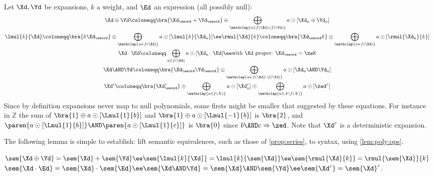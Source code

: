 \documentclass[a4paper,USenglish]{lipics}
\begin{document}
Let $\Xd, \Yd$ be expansions, $k$ a weight, and $\Ed$ an expression (all
possibly null):
\begin{gather}
  \label{eq:epn:plus:epn}
  \Xd \oplus \Yd
  \coloneqq
  \bra{\Xd_\eword+ \Yd_\eword}\oplus\bigoplus_{\mathclap{a \in f(\Xd) \cup f(\Yd)}} a \odot [\Xd_a \oplus \Yd_a]
  \\
  \lmul{k}{\Xd} \coloneqq \bra{k\Xd_\eword} \oplus \bigoplus_{\mathclap{a \in f(\Xd)}} a \odot [\lmul{k}{\Xd_a}]
  \ee
\rmul{\Xd}{k} \coloneqq \bra{\Xd_\eword k} \oplus \bigoplus_{\mathclap{a \in f(\Xd)}} a \odot [\rmul{\Xd_a}{k}]
  \\
  \label{eq:epn:mul:epn}
  \Xd\cdot\Ed \coloneqq \bigoplus_{a \in f(\Xd)} a \odot [\Xd_a \cdot \Ed] \ee \text{with $\Xd$ proper: $\Xd_\eword = \zeK$}
  \\
  \label{eq:epn:and:epn}
  \Xd \AND \Yd \coloneqq \bra{\Xd_\eword\Yd_\eword}
    \oplus
    \bigoplus_{\mathclap{a \in f(\Xd) \cap f(\Yd)}} a \odot [\Xd_a \AND \Yd_a]
  \\
  \label{eq:epn:compl:epn}
  \Xd^{c} \coloneqq \bra{\Xd_\eword^{c}}
  \oplus \bigoplus_{\mathclap{a \in f(X)}} a \odot [\Xd_a^{c}] \oplus \bigoplus_{\mathclap{a \in A\setminus f(X)}} a \odot [\zed^{c}]
\end{gather}
Since by definition expansions never map to null polynomials, some firsts
might be smaller that suggested by these equations.  For instance in
$\mathbb{Z}$ the sum of $\bra{1} \oplus a \odot [\Lmul{1}{b}]$ and
$\bra{1} \oplus a \odot [\Lmul{-1}{b}]$ is $\bra{2}$, and
$\paren{a \odot[\Lmul{1}{b}]} \AND \paren{a \odot[\Lmul{1}{c}]}$ is
$\bra{0}$ since $b\AND c \Rightarrow \zed$.  Note that $\Xd^c$ is a
deterministic expansion.

The following lemma is simple to establish: lift semantic equivalences,
such as those of \cref{prop:series}, to syntax, using \cref{lem:poly:ops}.
\begin{Lemma}
  \label{lem:xpn:semantics}\begin{math}
    \sem{\Xd \oplus \Yd} = \sem{\Xd} + \sem{\Yd} \ee
    \sem{\lmul{k}{\Xd}} = \lmul{k}{\sem{\Xd}} \ee
    \sem{\rmul{\Xd}{k}} = \rmul{\sem{\Xd}}{k}
  \end{math}
  \\
  \begin{math}
    \sem{\Xd\cdot\Ed} = \sem{\Xd}\cdot\sem{\Ed}
    \ee
    \sem{\Xd \AND \Yd} = \sem{\Xd} \AND \sem{\Yd}
    \ee
    \sem{\Xd^{c}} = \sem{\Xd}^{c}
  \end{math}.
\end{Lemma}
\end{document}
